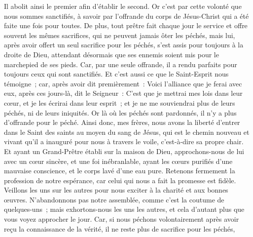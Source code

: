 \begin{multicols}{2}
Il abolit ainsi le premier afin d'établir le second.
Or c'est par cette volonté que nous sommes sanctifiés, à savoir par l'offrande du corps de Jésus-Christ qui a été faite une fois pour toutes.
De plus, tout prêtre fait chaque jour le service et offre souvent les mêmes sacrifices, qui ne peuvent jamais ôter les péchés,
mais lui, après avoir offert un seul sacrifice pour les péchés, s'est assis pour toujours à la droite de Dieu,
attendant désormais que ses ennemis soient mis pour le marchepied de ses pieds.
Car, par une seule offrande, il a rendu parfaits pour toujours ceux qui sont sanctifiés.
Et c'est aussi ce que le Saint-Esprit nous témoigne~; car, après avoir dit premièrement~:
Voici l'alliance que je ferai avec eux, après ces jours-là, dit le Seigneur~: C'est que je mettrai mes lois dans leur cœur, et je les écrirai dans leur esprit~;
et je ne me souviendrai plus de leurs péchés, ni de leurs iniquités.
Or là où les péchés sont pardonnés, il n'y a plus d'offrande pour le péché.
Ainsi donc, mes frères, nous avons la liberté d'entrer dans le Saint des saints au moyen du sang de Jésus,
qui est le chemin nouveau et vivant qu'il a inauguré pour nous à travers le voile, c'est-à-dire sa propre chair.
Et ayant un Grand-Prêtre établi sur la maison de Dieu,
approchons-nous de lui avec un cœur sincère, et une foi inébranlable, ayant les cœurs purifiés d'une mauvaise conscience, et le corps lavé d'une eau pure.
Retenons fermement la profession de notre espérance, car celui qui nous a fait la promesse est fidèle.
Veillons les uns sur les autres pour nous exciter à la charité et aux bonnes œuvres.
N'abandonnons pas notre assemblée, comme c'est la coutume de quelques-uns~; mais exhortons-nous les uns les autres, et cela d'autant plus que vous voyez approcher le jour.
Car, si nous péchons volontairement après avoir reçu la connaissance de la vérité, il ne reste plus de sacrifice pour les péchés,

\end{multicols}

